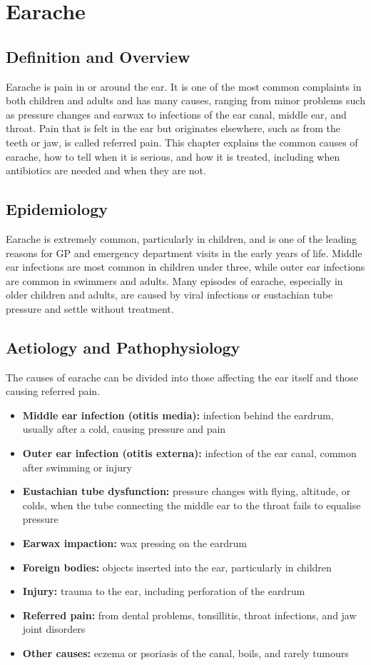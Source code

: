 \chapter{Earache}

\section*{Definition and Overview}
Earache is pain in or around the ear. It is one of the most common complaints in both children and adults and has many causes, ranging from minor problems such as pressure changes and earwax to infections of the ear canal, middle ear, and throat. Pain that is felt in the ear but originates elsewhere, such as from the teeth or jaw, is called referred pain. This chapter explains the common causes of earache, how to tell when it is serious, and how it is treated, including when antibiotics are needed and when they are not.

\section*{Epidemiology}
Earache is extremely common, particularly in children, and is one of the leading reasons for GP and emergency department visits in the early years of life. Middle ear infections are most common in children under three, while outer ear infections are common in swimmers and adults. Many episodes of earache, especially in older children and adults, are caused by viral infections or eustachian tube pressure and settle without treatment.

\section*{Aetiology and Pathophysiology}
The causes of earache can be divided into those affecting the ear itself and those causing referred pain.
\begin{itemize}
    \item \textbf{Middle ear infection (otitis media):} infection behind the eardrum, usually after a cold, causing pressure and pain
    \item \textbf{Outer ear infection (otitis externa):} infection of the ear canal, common after swimming or injury
    \item \textbf{Eustachian tube dysfunction:} pressure changes with flying, altitude, or colds, when the tube connecting the middle ear to the throat fails to equalise pressure
    \item \textbf{Earwax impaction:} wax pressing on the eardrum
    \item \textbf{Foreign bodies:} objects inserted into the ear, particularly in children
    \item \textbf{Injury:} trauma to the ear, including perforation of the eardrum
    \item \textbf{Referred pain:} from dental problems, tonsillitis, throat infections, and jaw joint disorders
    \item \textbf{Other causes:} eczema or psoriasis of the canal, boils, and rarely tumours
\end{itemize}

